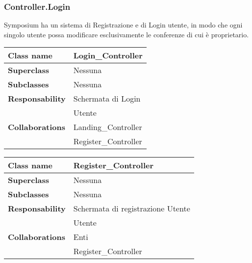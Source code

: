 \subsubsection{Controller.Login}
Symposium ha un sistema di Registrazione e di Login utente, in modo che ogni singolo utente possa modificare esclusivamente le conferenze di cui è proprietario.
\newpage
\begin{table}[h!]
	\begin{tabular}{|l|l|}
		\hline 
		\textbf{Class name} & Login\_Controller
		\\ \hline
		\textbf{Superclass} & Nessuna
		\\ \hline
		\multirow{1}{*}{\textbf{Subclasses}} & Nessuna
		\\ \hline
		\textbf{Responsability} & Schermata di Login
		\\ \hline
		\multirow{3}{*}{\textbf{Collaborations}} & Utente \\
		& Landing\_Controller\\
		& Register\_Controller
		\\ \hline
	\end{tabular}
\end{table}  

\begin{table}[h!]
	\begin{tabular}{|l|l|}
		\hline 
		\textbf{Class name} & Register\_Controller
		\\ \hline
		\textbf{Superclass} & Nessuna
		\\ \hline
		\multirow{1}{*}{\textbf{Subclasses}} & Nessuna
		\\ \hline
		\textbf{Responsability} & Schermata di registrazione Utente
		\\ \hline
		\multirow{3}{*}{\textbf{Collaborations}} & Utente \\
		& Enti\\
		& Register\_Controller
		\\ \hline
	\end{tabular}
\end{table}  

